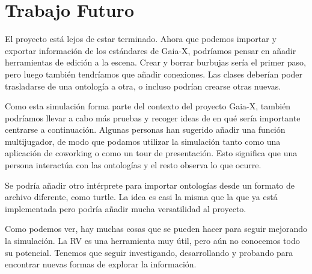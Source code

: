 \section{Trabajo Futuro}

El proyecto está lejos de estar terminado. Ahora que podemos importar y exportar información de los estándares de Gaia-X, podríamos pensar en añadir herramientas de edición a la escena.
Crear y borrar burbujas sería el primer paso, pero luego también tendríamos que añadir conexiones. Las clases deberían poder trasladarse de una ontología a otra, o incluso podrían crearse otras nuevas.

Como esta simulación forma parte del contexto del proyecto Gaia-X, también podríamos llevar a cabo más pruebas y recoger ideas de en qué sería importante centrarse a continuación. Algunas personas han sugerido añadir una función multijugador, de modo que podamos utilizar la simulación tanto
como una aplicación de coworking o como un tour de presentación. Esto significa que una persona interactúa con las ontologías y el resto observa lo que ocurre.

Se podría añadir otro intérprete para importar ontologías desde un formato de archivo diferente, como turtle. La idea es casi la misma que la que ya está implementada pero podría añadir mucha versatilidad al proyecto.

Como podemos ver, hay muchas cosas que se pueden hacer para seguir mejorando la simulación. La RV es una herramienta muy útil, pero aún no conocemos todo su potencial. Tenemos que seguir investigando, desarrollando y probando para encontrar nuevas formas de explorar la información.